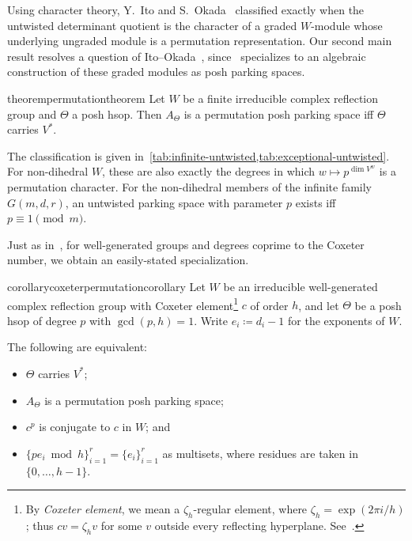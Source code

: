 \documentclass[10pt,a4paper]{amsart}
\newcommand{\defeq}{\coloneqq}
\theoremstyle{definition}
\begin{document}
Using character theory, Y.~Ito and S.~Okada~\cite[Theorem~1.4]{IO} classified exactly when the untwisted determinant quotient is the character of a graded $W$-module whose underlying ungraded module is a permutation representation.  %
Our second main result resolves a question of Ito--Okada~\cite[Problem 7.3(2)]{IO}, since~ specializes to an algebraic construction of these graded modules as posh parking spaces. %


\begin{restatable}{theorem}{permutationtheorem}\label{c:thm:untwisted}
Let $W$ be a finite irreducible complex reflection group and $\Theta$ a posh hsop. Then $A_\Theta$ is a permutation posh parking space iff $\Theta$ carries $V^*$.
\end{restatable}


The classification is given in~\cref{tab:infinite-untwisted,tab:exceptional-untwisted}.
For non-dihedral $W$, these are also exactly the degrees in which $w\mapsto p^{\dim V^w}$ is a permutation character.  For the non-dihedral members of the infinite family $G(m,d,r)$, an untwisted parking space with parameter $p$ exists iff $p\equiv1\pmod m$.

Just as in~, for well-generated groups and degrees coprime to the Coxeter number,
we obtain an easily-stated specialization.

\begin{restatable}{corollary}{coxeterpermutationcorollary}\label{cor:coxeter-permutation}
Let $W$ be an irreducible well-generated complex reflection group with
Coxeter element\footnote{By \emph{Coxeter element}, we mean a
$\zeta_h$-regular element, where $\zeta_h=\exp(2\pi i/h)$;
thus $cv=\zeta_hv$ for some $v$ outside every reflecting hyperplane.
See~\cite[Section~1.1]{RRS}.} $c$ of order $h$, and let $\Theta$ be a posh hsop of degree $p$
with $\gcd(p,h)=1$. Write $e_i\defeq d_i-1$ for the exponents of $W$.

The following are equivalent:
\begin{itemize}
\item $\Theta$ carries $V^*$;
\item $A_\Theta$ is a permutation posh parking space;
\item $c^p$ is conjugate to $c$ in $W$; and
\item $
 \{p e_i\bmod h\}_{i=1}^r=\{e_i\}_{i=1}^r$
as multisets, where residues are taken in $\{0,\ldots,h-1\}$.
\end{itemize}
\end{restatable}
\end{document}
